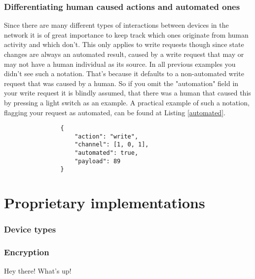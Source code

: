 \documentclass[11pt,a4paper, titlepage]{article}
\begin{document}
		\section[Automation]{Differentiating human caused actions and automated ones}
			Since there are many different types of interactions between devices in the network it is of great importance to keep track which ones originate from human activity and which don't. This only applies to write requests though since state changes are always an automated result, caused by a write request that may or may not have a human individual as its source. In all previous examples you didn't see such a notation. That's because it defaults to a non-automated write request that was caused by a human. So if you omit the "automation" field in your write request it is blindly assumed, that there was a human that caused this by pressing a light switch as an example. A practical example of such a notation, flagging your request as automated, can be found at Listing \ref{automated}.
			
			\begin{listing}
				\begin{verbatim}
				{
					"action": "write",
					"channel": [1, 0, 1],
					"automated": true,
					"payload": 89
				}
				\end{verbatim}
				\caption{Automated request}
				\label{automated}
			\end{listing}
		
	\part{Proprietary implementations}
		\section{Device types}
		\section{Encryption}
			\label{sec:encryption}
			Hey there! What's up!
			\blindtext
		
		
\end{document}
